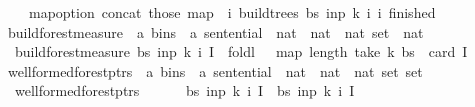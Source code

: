 \begin{isabellebody}
\ \ \ \ map{\isacharunderscore}{\kern0pt}option\ concat\ {\isacharparenleft}{\kern0pt}those\ {\isacharparenleft}{\kern0pt}map\ {\isacharparenleft}{\kern0pt}{\isasymlambda}{\isacharparenleft}{\kern0pt}{\isacharunderscore}{\kern0pt}{\isacharcomma}{\kern0pt}\ i{\isacharparenright}{\kern0pt}{\isachardot}{\kern0pt}\ build{\isacharunderscore}{\kern0pt}trees{\isacharprime}{\kern0pt}\ bs\ inp\ k\ i\ {\isacharbraceleft}{\kern0pt}i{\isacharbraceright}{\kern0pt}{\isacharparenright}{\kern0pt}\ finished{\isacharparenright}{\kern0pt}{\isacharparenright}{\kern0pt}{\isachardoublequoteclose}\isanewline
\isanewline
{}\isamarkupfalse%
\ build{\isacharunderscore}{\kern0pt}forest{\isacharprime}{\kern0pt}{\isacharunderscore}{\kern0pt}measure\ {\isacharcolon}{\kern0pt}{\isacharcolon}{\kern0pt}\ {\isachardoublequoteopen}{\isacharparenleft}{\kern0pt}{\isacharprime}{\kern0pt}a\ bins\ {\isasymtimes}\ {\isacharprime}{\kern0pt}a\ sentential\ {\isasymtimes}\ nat\ {\isasymtimes}\ nat\ {\isasymtimes}\ nat\ set{\isacharparenright}{\kern0pt}\ {\isasymRightarrow}\ nat{\isachardoublequoteclose}\ \isanewline
\ \ {\isachardoublequoteopen}build{\isacharunderscore}{\kern0pt}forest{\isacharprime}{\kern0pt}{\isacharunderscore}{\kern0pt}measure\ {\isacharparenleft}{\kern0pt}bs{\isacharcomma}{\kern0pt}\ inp{\isacharcomma}{\kern0pt}\ k{\isacharcomma}{\kern0pt}\ i{\isacharcomma}{\kern0pt}\ I{\isacharparenright}{\kern0pt}\ {\isacharequal}{\kern0pt}\ foldl\ {\isacharparenleft}{\kern0pt}{\isacharplus}{\kern0pt}{\isacharparenright}{\kern0pt}\ {}\ {\isacharparenleft}{\kern0pt}map\ length\ {\isacharparenleft}{\kern0pt}take\ {\isacharparenleft}{\kern0pt}k{\isacharplus}{\kern0pt}{}{\isacharparenright}{\kern0pt}\ bs{\isacharparenright}{\kern0pt}{\isacharparenright}{\kern0pt}\ {\isacharminus}{\kern0pt}\ card\ I{\isachardoublequoteclose}\isanewline
\isanewline
{}\isamarkupfalse%
\ wellformed{\isacharunderscore}{\kern0pt}forest{\isacharunderscore}{\kern0pt}ptrs\ {\isacharcolon}{\kern0pt}{\isacharcolon}{\kern0pt}\ {\isachardoublequoteopen}{\isacharparenleft}{\kern0pt}{\isacharprime}{\kern0pt}a\ bins\ {\isasymtimes}\ {\isacharprime}{\kern0pt}a\ sentential\ {\isasymtimes}\ nat\ {\isasymtimes}\ nat\ {\isasymtimes}\ nat\ set{\isacharparenright}{\kern0pt}\ set{\isachardoublequoteclose}\ \isanewline
\ \ {\isachardoublequoteopen}wellformed{\isacharunderscore}{\kern0pt}forest{\isacharunderscore}{\kern0pt}ptrs\ {\isacharequal}{\kern0pt}\ {\isacharbraceleft}{\kern0pt}\isanewline
\ \ \ \ {\isacharparenleft}{\kern0pt}bs{\isacharcomma}{\kern0pt}\ inp{\isacharcomma}{\kern0pt}\ k{\isacharcomma}{\kern0pt}\ i{\isacharcomma}{\kern0pt}\ I{\isacharparenright}{\kern0pt}\ {\isacharbar}{\kern0pt}\ bs\ inp\ k\ i\ I{\isachardot}{\kern0pt}\isanewline

\end{isabellebody}
